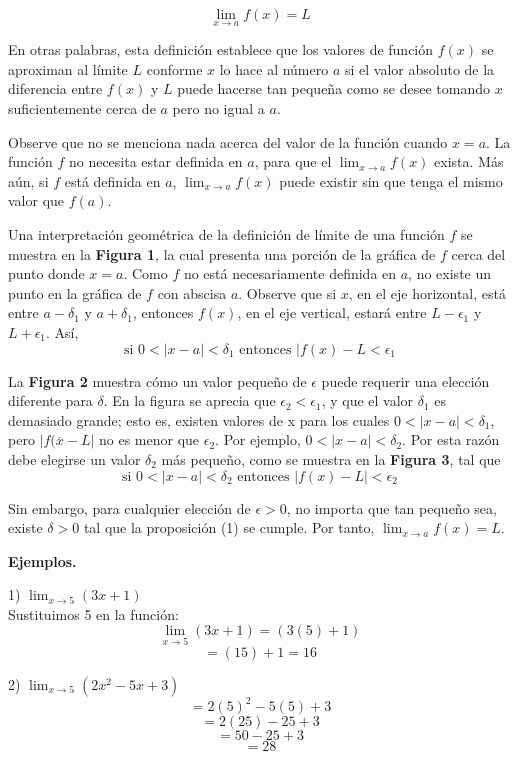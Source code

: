 \documentclass[11pt]{report}
\begin{document}
$$\lim_{x \to a}f(x)=L$$

\hspace*{10mm}En otras palabras, esta definición establece que los valores de función $f(x)$ se aproximan al límite $L$ conforme $x$ lo hace al número $a$ si el valor absoluto de la diferencia entre $f(x)$ y $L$ puede hacerse tan pequeña como se desee tomando $x$ suficientemente cerca de $a$ pero no igual a $a$.

\hspace*{10mm}Observe que no se menciona nada acerca del valor de la función cuando $x=a$. La función $f$ no necesita estar definida en $a$, para que el $\lim_{x \to a}f(x)$ exista. Más aún, si $f$ está definida en $a$, $\lim_{x \to a}f(x)$ puede existir sin que tenga el mismo valor que $f(a)$.

\hspace*{10mm}Una interpretación geométrica de la definición de límite de una función $f$ se muestra en la \textbf{Figura 1}, la cual presenta una porción de la gráfica de $f$ cerca del punto donde $x = a$. Como $f$ no está necesariamente definida en $a$, no existe un punto en la gráfica de $f$ con abscisa $a$. Observe que si $x$, en el eje horizontal, está entre $a - \delta_1$ y $a + \delta_1$, entonces $f(x)$, en el eje vertical, estará entre $L - \epsilon_1$ y $L + \epsilon_1$. Así, $$\text{si }0 < |x-a| < \delta_1\text{   entonces }|f(x) - L < \epsilon_1$$

La \textbf{Figura 2} muestra cómo un valor pequeño de $\epsilon$ puede requerir una elección diferente para $\delta$. En la figura se aprecia que $\epsilon_2 < \epsilon_1$, y que el valor $\delta_1$ es demasiado grande; esto es, existen valores de x para los cuales $0 < |x-a| < \delta_1$, pero $|f(\overline{x} - L|$ no es menor que $\epsilon_2$. Por ejemplo, $0 < |x-a| < \delta_2$. Por esta razón debe elegirse un valor $\delta_2$ más pequeño, como se muestra en la \textbf{Figura 3}, tal que $$\text{si }0 < |x-a| < \delta_2\text{ entonces }|f(x) - L| < \epsilon_2$$

Sin embargo, para cualquier elección de $\epsilon > 0$, no importa que tan pequeño sea, existe $\delta > 0$ tal que la proposición (1) se cumple. Por tanto, $\lim_{x \to a}f(x)=L$. 

\pagebreak \textbf{Ejemplos.}

1) $\lim_{x\to5} (3x+1)$\\[2mm]
Sustituimos 5 en la función:
$$\lim_{x\to5} (3x+1) = (3(5)+1)$$
$$=(15)+1 = 16$$

2) $\lim_{x\to5} (2x^2-5x+3)$\\[2mm]
$$=2(5)^2-5(5)+3$$
$$=2(25)-25+3$$
$$=50-25+3$$
$$=28$$
\end{document}
